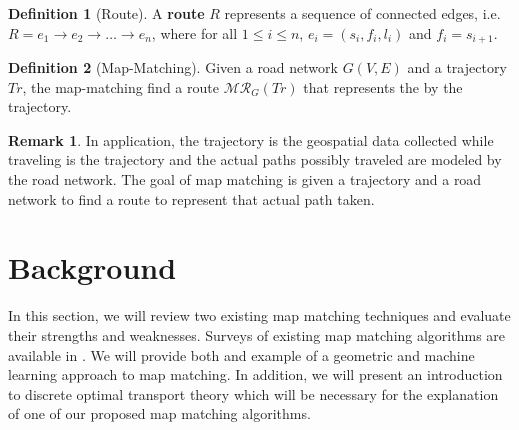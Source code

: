 \documentclass{article}
\numberwithin{equation}{section}
\theoremstyle{definition}
\newtheorem{definition}{Definition}[section]
\newtheorem{remark}[remark]{Remark}
\begin{document}
\begin{definition}[Route]
A  \textbf{route} $R$ represents a sequence of connected edges, i.e. $R = e_1\rightarrow e_2 \rightarrow \dots \rightarrow e_n$, {\color{blue} where for all $1\leq i\leq n$, $e_i=(s_i,f_i,l_i)$ and $f_i =s_{i+1}$.}%
\end{definition}

\begin{definition}[Map-Matching]
Given a road network $G(V, E)$ and a trajectory
$Tr$, the map-matching find a route $\mathcal{MR}_G(Tr)$ that represents the  by the trajectory.
\end{definition}

\begin{remark}
In application, the trajectory is the geospatial data collected while traveling is the trajectory and the actual paths possibly traveled are modeled by the road network. The goal of map matching is given a trajectory and a road network to find a route to represent that actual path taken. 
\end{remark}



    



\section{Background}

In this section, we will review two existing map matching techniques and evaluate their strengths and weaknesses. Surveys of existing map matching algorithms are available in \cite{C,Q}. We will provide both and example of a geometric and machine learning approach to map matching. 
In addition, we will present an introduction to discrete optimal transport theory which will be necessary for the explanation of one of our proposed map matching algorithms.
\end{document}
